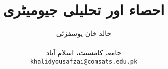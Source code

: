 \documentclass[leqno,b5paper]{book}
\author{
خالد خان یوسفزئی\\
\\
{\small {جامعہ کامسیٹ، اسلام آباد}}\\
\texttt{khalidyousafzai@comsats.edu.pk}
}
\title{احصاء اور تحلیلی جیومیٹری}
\date{}                           %
\begin{document}
\begin{urdufont}


\renewcommand*{\contentsname}{عنوان}    %
\renewcommand*{\proofname}{ثبوت}   %
\renewcommand*{\appendixname}{ضمیمہ}


\frontmatter                          %

\maketitle

\tableofcontents
\pagestyle{empty}
\newpage

\newpage

%


\mainmatter                      %
\renewcommand*{\chaptername}{باب}

\pagestyle{headings}











\appendix


%

%
%
%
\backmatter

\cleardoublepage
%
%



\renewcommand*{\indexname}{فرہنگ}      %
\cleardoublepage
{}


\end{urdufont}
\end{document}
